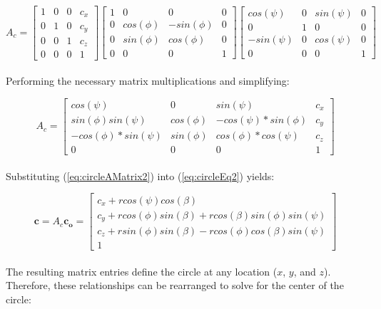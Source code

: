 \documentclass[12pt]{article}
\begin{document}

\begin{equation}
	A_c=
    \begin{bmatrix}
       1 & 0 & 0 & c_x \\
       0 & 1 & 0 & c_y \\
       0 & 0 & 1 & c_z \\
       0 & 0 & 0 & 1 
    \end{bmatrix}
    \begin{bmatrix}
       1 & 0 & 0 & 0 \\
       0 & cos(\phi) & -sin(\phi) & 0 \\
       0 & sin(\phi) & cos(\phi) & 0 \\
       0 & 0 & 0 & 1 
    \end{bmatrix}
     \begin{bmatrix}
       cos(\psi) & 0 & sin(\psi) & 0 \\
       0 & 1 & 0 & 0 \\
       -sin(\psi) & 0 & cos(\psi) & 0 \\
       0 & 0 & 0 & 1 
    \end{bmatrix}
    \label{eq:circleAMatrix}
\end{equation}
\\
Performing the necessary matrix multiplications and simplifying: 

\begin{equation}
	A_c=
     \begin{bmatrix}
       cos(\psi) & 0 & sin(\psi) & c_x \\
       sin(\phi)sin(\psi) & cos(\phi) &  -cos(\psi)*sin(\phi) & c_y \\
       -cos(\phi)*sin(\psi) & sin(\phi) &  cos(\phi)*cos(\psi) & c_z \\
       0 & 0 & 0 & 1 
    \end{bmatrix}
    \label{eq:circleAMatrix2}
\end{equation}
\\
Substituting (\ref{eq:circleAMatrix2}) into (\ref{eq:circleEq2}) yields:

\begin{equation}
	\mathbf{c}=A_c\mathbf{c_o}=
    \begin{bmatrix}
     	c_x + rcos(\psi)cos(\beta) \\
 		c_y + rcos(\phi)sin(\beta) + rcos(\beta)sin(\phi)sin(\psi) \\
 		c_z + rsin(\phi)sin(\beta) - rcos(\phi)cos(\beta)sin(\psi) \\                             1
    \end{bmatrix}
    \label{eq:circleEq3}
\end{equation}
\\
The resulting matrix entries define the circle at any location ($x$, $y$, and $z$).  Therefore, these relationships can be rearranged to solve for the center of the circle: 
\end{document}
